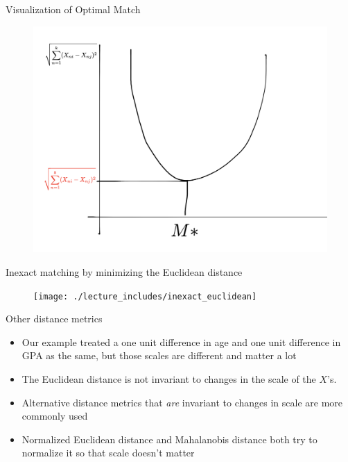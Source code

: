 \documentclass{beamer}
\begin{document}
\begin{frame}{Visualization of Optimal Match}

\begin{figure}[!t]\centering
\includegraphics[scale=0.35]{./lecture_includes/optimal_matches}
\end{figure}

\end{frame}


 

\begin{frame}{Inexact matching by minimizing the Euclidean distance}

\begin{figure}[!t]\centering
\texttt{[image: ./lecture\_includes/inexact\_euclidean]}
\end{figure}

\end{frame}

\begin{frame}{Other distance metrics}

\begin{itemize}
\item Our example treated a one unit difference in age and one unit difference in GPA as the same, but those scales are different and matter a lot
\item The Euclidean distance is not invariant to changes in the scale of the $X$'s.  
\item Alternative distance metrics that \emph{are} invariant to changes in scale are more commonly used 
\item Normalized Euclidean distance and Mahalanobis distance both try to normalize it so that scale doesn't matter
\end{itemize}

\end{frame}
\end{document}
